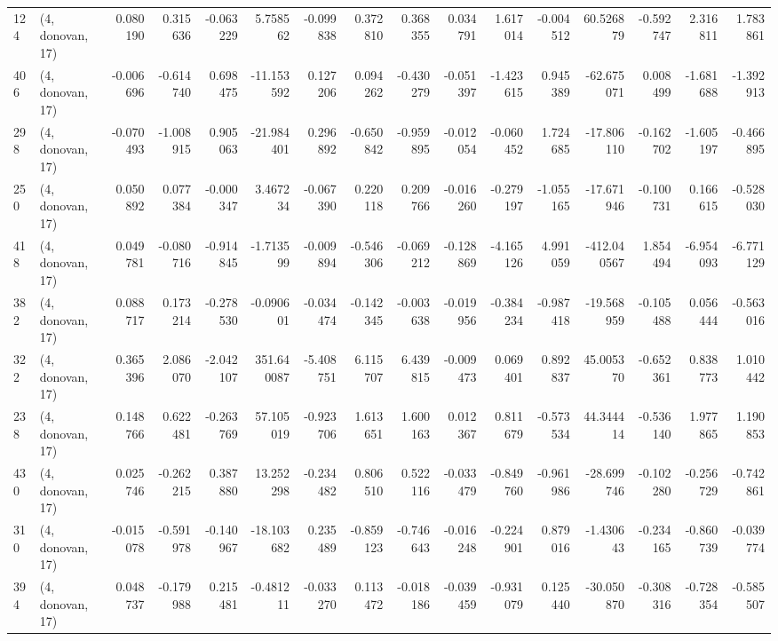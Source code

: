 \begin{tabular}{llrrrrrrrrrrrrrr}
124 &  (4, donovan, 17) &   0.080190 &  0.315636 & -0.063229 &    5.758562 & -0.099838 &   0.372810 &  0.368355 &  0.034791 &  1.617014 & -0.004512 &   60.526879 & -0.592747 &  2.316811 &  1.783861 \\
406 &  (4, donovan, 17) &  -0.006696 & -0.614740 &  0.698475 &  -11.153592 &  0.127206 &   0.094262 & -0.430279 & -0.051397 & -1.423615 &  0.945389 &  -62.675071 &  0.008499 & -1.681688 & -1.392913 \\
298 &  (4, donovan, 17) &  -0.070493 & -1.008915 &  0.905063 &  -21.984401 &  0.296892 &  -0.650842 & -0.959895 & -0.012054 & -0.060452 &  1.724685 &  -17.806110 & -0.162702 & -1.605197 & -0.466895 \\
250 &  (4, donovan, 17) &   0.050892 &  0.077384 & -0.000347 &    3.467234 & -0.067390 &   0.220118 &  0.209766 & -0.016260 & -0.279197 & -1.055165 &  -17.671946 & -0.100731 &  0.166615 & -0.528030 \\
418 &  (4, donovan, 17) &   0.049781 & -0.080716 & -0.914845 &   -1.713599 & -0.009894 &  -0.546306 & -0.069212 & -0.128869 & -4.165126 &  4.991059 & -412.040567 &  1.854494 & -6.954093 & -6.771129 \\
382 &  (4, donovan, 17) &   0.088717 &  0.173214 & -0.278530 &   -0.090601 & -0.034474 &  -0.142345 & -0.003638 & -0.019956 & -0.384234 & -0.987418 &  -19.568959 & -0.105488 &  0.056444 & -0.563016 \\
322 &  (4, donovan, 17) &   0.365396 &  2.086070 & -2.042107 &  351.640087 & -5.408751 &   6.115707 &  6.439815 & -0.009473 &  0.069401 &  0.892837 &   45.005370 & -0.652361 &  0.838773 &  1.010442 \\
238 &  (4, donovan, 17) &   0.148766 &  0.622481 & -0.263769 &   57.105019 & -0.923706 &   1.613651 &  1.600163 &  0.012367 &  0.811679 & -0.573534 &   44.344414 & -0.536140 &  1.977865 &  1.190853 \\
430 &  (4, donovan, 17) &   0.025746 & -0.262215 &  0.387880 &   13.252298 & -0.234482 &   0.806510 &  0.522116 & -0.033479 & -0.849760 & -0.961986 &  -28.699746 & -0.102280 & -0.256729 & -0.742861 \\
310 &  (4, donovan, 17) &  -0.015078 & -0.591978 & -0.140967 &  -18.103682 &  0.235489 &  -0.859123 & -0.746643 & -0.016248 & -0.224901 &  0.879016 &   -1.430643 & -0.234165 & -0.860739 & -0.039774 \\
394 &  (4, donovan, 17) &   0.048737 & -0.179988 &  0.215481 &   -0.481211 & -0.033270 &   0.113472 & -0.018186 & -0.039459 & -0.931079 &  0.125440 &  -30.050870 & -0.308316 & -0.728354 & -0.585507 \\

\end{tabular}
